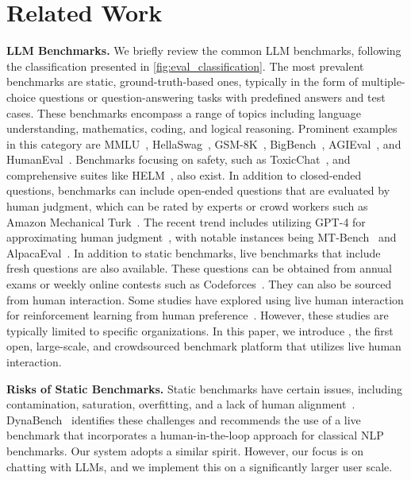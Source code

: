 \section{Related Work}

\textbf{LLM Benchmarks.}
We briefly review the common LLM benchmarks, following the classification presented in \autoref{fig:eval_classification}. The most prevalent benchmarks are static, ground-truth-based ones, typically in the form of multiple-choice questions or question-answering tasks with predefined answers and test cases.
These benchmarks encompass a range of topics including language understanding, mathematics, coding, and logical reasoning. Prominent examples in this category are MMLU~\cite{hendrycks2020measuring}, HellaSwag~\cite{zellers2019hellaswag}, GSM-8K~\cite{cobbe2021gsm}, BigBench~\cite{srivastava2023beyond}, AGIEval~\cite{zhong2023agieval}, and HumanEval~\cite{chen2021evaluating}. Benchmarks focusing on safety, such as ToxicChat~\cite{toxicchat}, and comprehensive suites like HELM~\cite{liang2022holistic}, also exist.
In addition to closed-ended questions, benchmarks can include open-ended questions that are evaluated by human judgment, which can be rated by experts or crowd workers such as Amazon Mechanical Turk~\cite{karpinska-etal-2021-perils,koala_blogpost_2023,wang-etal-2023-self-instruct}.
The recent trend includes utilizing GPT-4 for approximating human judgment~\cite{chiang-lee-2023-large}, with notable instances being MT-Bench~\cite{zheng2023judging} and AlpacaEval~\cite{alpaca_eval}.
In addition to static benchmarks, live benchmarks that include fresh questions are also available. These questions can be obtained from annual exams or weekly online contests such as Codeforces~\cite{li2022competition, huang2023competition}. They can also be sourced from human interaction. Some studies have explored using live human interaction for reinforcement learning from human preference~\cite{bai2022training,ouyang2022training,touvron2023llama2}. However, these studies are typically limited to specific organizations.
In this paper, we introduce \system, the first open, large-scale, and crowdsourced benchmark platform that utilizes live human interaction.

\textbf{Risks of Static Benchmarks.}
Static benchmarks have certain issues, including contamination, saturation, overfitting, and a lack of human alignment~\cite{yang2023rethinking,oren2023proving}. DynaBench~\cite{kiela2021dynabench} identifies these challenges and recommends the use of a live benchmark that incorporates a human-in-the-loop approach for classical NLP benchmarks. Our system adopts a similar spirit. However, our focus is on chatting with LLMs, and we implement this on a significantly larger user scale.

